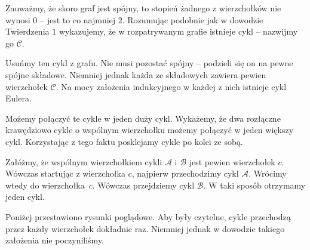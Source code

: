 \noindent
Zauważmy, że skoro graf jest spójny, to stopień żadnego z wierzchołków nie wynosi $0$ -- jest to co najmniej $2$. Rozumując podobnie jak w dowodzie Twierdzenia $1$ wykazujemy, że w rozpatrywanym grafie istnieje cykl -- nazwijmy go $\mathcal{C}$.

\vspace{5px}

\noindent
Usuńmy ten cykl z grafu. Nie musi pozostać spójny -- podzieli się on na pewne spójne składowe. Niemniej jednak każda ze składowych zawiera pewien wierzchołek $\mathcal{C}$. Na mocy założenia indukcyjnego w każdej z nich istnieje cykl Eulera. 

\vspace{5px}

\noindent
Możemy połączyć te cykle w jeden duży cykl. Wykażemy, że dwa rozłączne krawędziowo cykle o wspólnym wierzchołku możemy połączyć w jeden większy cykl. Korzystając z tego faktu posklejamy cykle po kolei ze sobą.

\vspace{5px}

\noindent
Załóżmy, że wspólnym wierzchołkiem cykli $\mathcal{A}$ i $\mathcal{B}$ jest pewien wierzchołek $c$. Wówczas startując z wierzchołka $c$, najpierw przechodzimy cykl $\mathcal{A}$. Wrócimy wtedy do wierzchołka~$c$. Wówczas przejdziemy cykl $\mathcal{B}$. W taki sposób otrzymamy jeden cykl.

\vspace{5px}

\noindent
Poniżej przestawiono rysunki poglądowe. Aby były czytelne, cykle przechodzą przez każdy wierzchołek dokładnie raz. Niemniej jednak w dowodzie takiego założenia nie poczyniliśmy.

